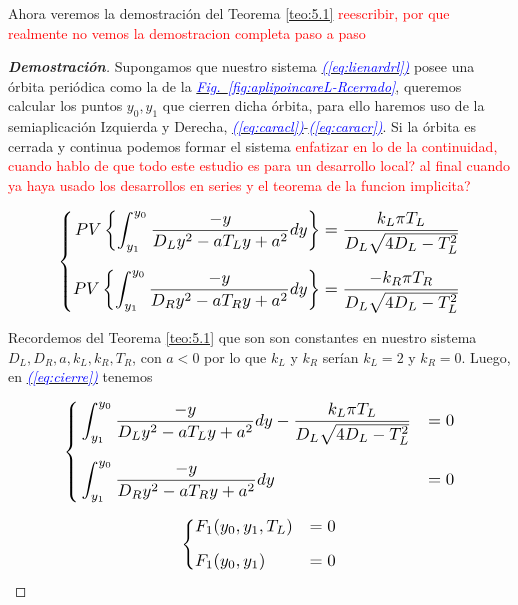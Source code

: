 \documentclass[12pt,a4paper]{report} %
\newcommand{\fref}[1]{\hyperref[#1]{\textcolor{blue}{\textit{Fig.~\ref*{#1}}}}}
\newcommand{\eref}[1]{\hyperref[#1]{\textcolor{blue}{\textit{(\ref*{#1})}}}}
\begin{document}
	\vspace{0.5cm}Ahora veremos la demostración del Teorema \ref{teo:5.1} \textcolor{red}{reescribir, por que realmente no vemos la demostracion completa paso a paso}
	\begin{proof}[\textbf{Demostración}]
		\label{dem5.1}
	Supongamos que nuestro sistema \eref{eq:lienardrl} posee una órbita periódica como la de la \fref{fig:aplipoincareL-Rcerrado}, queremos calcular los puntos $y_0, y_1$ que cierren dicha órbita, para ello haremos uso de la semiaplicación Izquierda y Derecha, \eref{eq:caracl}-\eref{eq:caracr}. Si la órbita es cerrada  y continua podemos formar el sistema \textcolor{red}{enfatizar en lo de la continuidad, cuando hablo de que todo este estudio es para un desarrollo local? al final cuando ya haya usado los desarrollos en series y el teorema de la funcion implicita?}
	
	\begin{equation}
		\label{eq:cierre}
		\scalebox{1.2}{$\displaystyle
			\left\{
			\begin{aligned}
				PV\left\{\int_{y_1}^{y_0}\frac{-y}{D_Ly^2-aT_Ly+a^2}dy\right\}&=\frac{k_L\pi T_L}{D_L\sqrt{4D_L-T_L^2}}
				\\[2mm]
				PV\left\{\int_{y_1}^{y_0}\frac{-y}{D_Ry^2-aT_Ry+a^2}dy\right\}&=\frac{-k_R\pi T_R}{D_L\sqrt{4D_L-T_L^2}}
			\end{aligned}
			\right. 
			$}
	\end{equation}\smallskip
	
	Recordemos del Teorema \ref{teo:5.1} que son son constantes en nuestro sistema $D_L,D_R,a,k_L,k_R,T_R$, con $a<0$ por lo que $k_L$ y $k_R$ serían $k_L=2$ y $k_R=0$. Luego, en \eref{eq:cierre} tenemos
	
	\begin{equation}
		\label{eq:cierre2}
		\scalebox{1.2}{$\displaystyle
			\left\{
			\begin{aligned}
				&\int_{y_1}^{y_0}\frac{-y}{D_Ly^2-aT_Ly+a^2}dy-\frac{k_L\pi T_L}{D_L\sqrt{4D_L-T_L^2}}&=0
				\\[2mm]
				&\int_{y_1}^{y_0}\frac{-y}{D_Ry^2-aT_Ry+a^2}dy&=0
			\end{aligned}
			\right. 
			$}
	\end{equation}\smallskip
	
	\begin{equation}
		\label{eq:cierre3}
		\scalebox{1.2}{$\displaystyle
			\left\{
			\begin{aligned}
				&F_1(y_0,y_1,T_L)&=0
				\\[2mm]
				&F_1(y_0,y_1)&=0
			\end{aligned}
			\right. 
			$}
	\end{equation}\smallskip
	

\end{proof}
\end{document}
